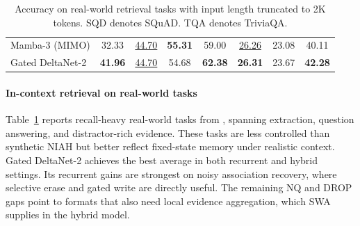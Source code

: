 \documentclass[10pt, logo, onecolumn, copyright]{nv}
\begin{document}
\begin{table}
\begin{tabular}{l|ccccccc}
\hspace{2mm} Mamba-3 (MIMO) & 32.33 & \underline{44.70} & \textbf{55.31} & 59.00 & \underline{26.26} & 23.08 & 40.11 \\
\hspace{2mm} Gated DeltaNet-2 & \textbf{41.96} & \underline{44.70} & 54.68 & \textbf{62.38} & \textbf{26.31} & 23.67 & \textbf{42.28} \\
\bottomrule
\end{tabular}
\caption{
Accuracy on real-world retrieval tasks with input length truncated to 2K tokens.
SQD denotes SQuAD. TQA denotes TriviaQA.
}
\label{tab_recall_results}
\vspace{-1\baselineskip}
\end{table}
\paragraph{In-context retrieval on real-world tasks}
Table~\ref{tab_recall_results} reports recall-heavy real-world tasks from \citep{arora-2024-jrt}, spanning extraction, question answering, and distractor-rich evidence. These tasks are less controlled than synthetic NIAH but better reflect fixed-state memory under realistic context. Gated DeltaNet-2 achieves the best average in both recurrent and hybrid settings. Its recurrent gains are strongest on noisy association recovery, where selective erase and gated write are directly useful. The remaining NQ and DROP gaps point to formats that also need local evidence aggregation, which SWA supplies in the hybrid model.
\end{document}

